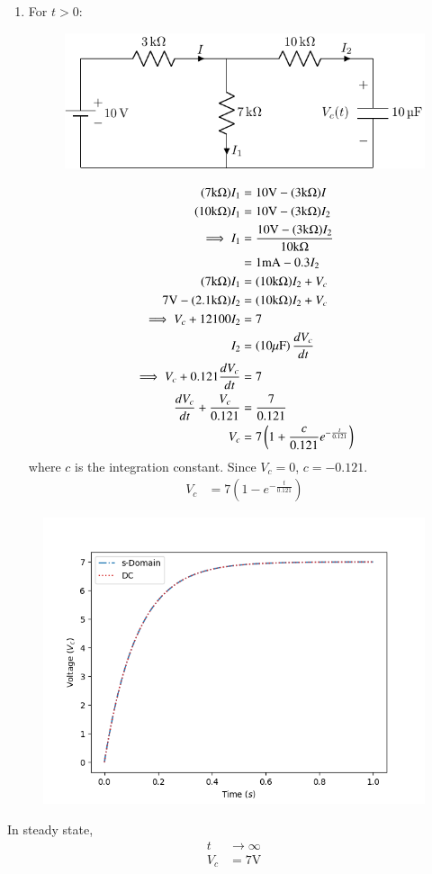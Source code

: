 \documentclass[journal,12pt,twocolumn]{IEEEtran}
\theoremstyle{remark}
\begin{document}
\begin{enumerate}
\item For $t > 0$:
\begin{figure}[h!]
    \centering
    \includegraphics[width=\columnwidth]{figs/c_fig3.pdf}
\end{figure}
\begin{align}
(7\text{k}\ohm)I_1 &= 10\text{V} - (3\text{k}\ohm)I \\
(10\text{k}\ohm)I_1 &= 10\text{V} - (3\text{k}\ohm)I_2 \\
\implies I_1 &= \frac{10\text{V} - (3\text{k}\ohm)I_2}{10\text{k}\ohm} \\
&= 1\text{mA} - 0.3I_2\\
(7\text{k}\ohm)I_1 &= (10\text{k}\ohm)I_2 + V_c \\
7\text{V} - (2.1\text{k}\ohm)I_2 &= (10\text{k}\ohm)I_2 + V_c \\
\implies V_c + 12100I_2 &= 7 \\
I_2 &= \left(10\mu\text{F}\right)\frac{dV_c}{dt} \\
\implies V_c + 0.121\frac{dV_c}{dt} &= 7 \\
\frac{dV_c}{dt} + \frac{V_c}{0.121} &= \frac{7}{0.121} \\
V_c &= 7\left(1 + \frac{c}{0.121}e^{-\frac{t}{0.121}}\right)
\end{align}
where $c$ is the integration constant.
Since $V_c = 0$, $c = -0.121$.
\begin{align}
V_c &= 7(1 - e^{-\frac{t}{0.121}})
\end{align}
\end{enumerate}
\begin{figure}[h!]
\centering
\includegraphics[width=\columnwidth]{figs/plot.png}
\label{fig:2023BM30}
\end{figure}
In steady state,
\begin{align}
t &\to \infty \\
V_c &= 7\text{V}
\end{align}
\end{document}
